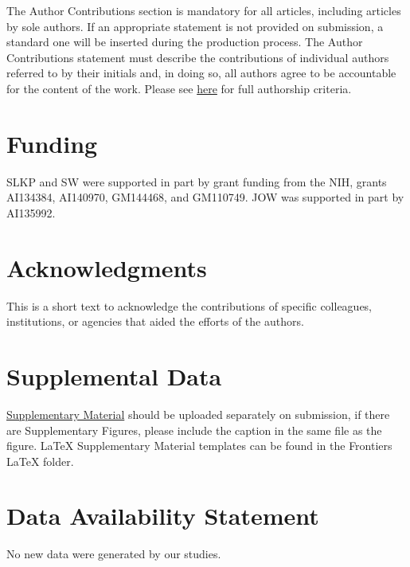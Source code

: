 \documentclass[utf8]{FrontiersinHarvard} %
\begin{document}
The Author Contributions section is mandatory for all articles, including
articles by sole authors. If an appropriate statement is not provided on
submission, a standard one will be inserted during the production process. The
Author Contributions statement must describe the contributions of individual
authors referred to by their initials and, in doing so, all authors agree to be
accountable for the content of the work. Please see
\href{https://www.frontiersin.org/guidelines/policies-and-publication-ethics#authorship-and-author-responsibilities}{here}
for full authorship criteria.

\section*{Funding}
SLKP and SW were supported in part by grant funding from the NIH, grants AI134384, AI140970, GM144468, and GM110749. JOW was supported in part by AI135992.

\section*{Acknowledgments}
This is a short text to acknowledge the contributions of specific colleagues, institutions, or agencies that aided the efforts of the authors.

\section*{Supplemental Data}
\href{https://www.frontiersin.org/guidelines/author-guidelines#supplementary-material}{Supplementary Material} should be uploaded separately on submission, if there are Supplementary Figures, please include the caption in the same file as the figure. LaTeX Supplementary Material templates can be found in the Frontiers LaTeX folder.

\section*{Data Availability Statement}

No new data were generated by our studies.


\nocite{*}
\end{document}
